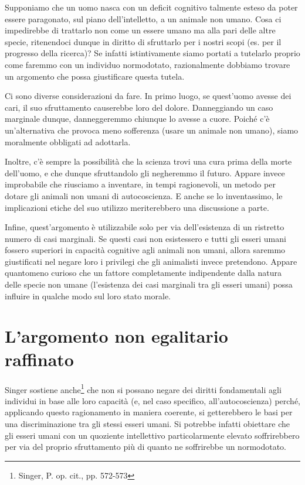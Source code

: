 \documentclass[a4paper,11pt,oneside,article]{memoir}
\begin{document}
Supponiamo che un uomo nasca con un deficit cognitivo talmente esteso da poter
essere paragonato, sul piano dell'intelletto, a un animale non umano. Cosa ci
impedirebbe di trattarlo non come un essere umano ma alla pari delle altre
specie, ritenendoci dunque in diritto di sfruttarlo per i nostri scopi (es. per
il progresso della ricerca)? Se infatti istintivamente siamo portati a tutelarlo
proprio come faremmo con un individuo normodotato, razionalmente dobbiamo
trovare un argomento che possa giustificare questa tutela.

Ci sono diverse considerazioni da fare. In primo luogo, se quest'uomo avesse dei
cari, il suo sfruttamento causerebbe loro del dolore. Danneggiando un caso
marginale dunque, danneggeremmo chiunque lo avesse a cuore. Poiché c'è
un'alternativa che provoca meno sofferenza (usare un animale non umano), siamo
moralmente obbligati ad adottarla.

Inoltre, c'è sempre la possibilità che la scienza trovi una cura prima della
morte dell'uomo, e che dunque sfruttandolo gli negheremmo il futuro. Appare
invece improbabile che riusciamo a inventare, in tempi ragionevoli, un metodo
per dotare gli animali non umani di autocoscienza. E anche se lo inventassimo,
le implicazioni etiche del suo utilizzo meriterebbero una discussione a parte.

Infine, quest'argomento è utilizzabile solo per via dell'esistenza di un
ristretto numero di casi marginali. Se questi casi non esistessero e tutti gli
esseri umani fossero superiori in capacità cognitive agli animali non umani,
allora saremmo giustificati nel negare loro i privilegi che gli animalisti
invece pretendono. Appare quantomeno curioso che un fattore completamente
indipendente dalla natura delle specie non umane (l'esistenza dei casi marginali
tra gli esseri umani) possa influire in qualche modo sul loro stato morale.

\section{L'argomento non egalitario raffinato}

Singer sostiene anche\footnote{Singer, P. op. cit., pp. 572-573} che non si
possano negare dei diritti fondamentali agli individui in base alle loro
capacità (e, nel caso specifico, all'autocoscienza) perché, applicando questo
ragionamento in maniera coerente, si getterebbero le basi per una
discriminazione tra gli stessi esseri umani. Si potrebbe infatti obiettare che
gli esseri umani con un quoziente intellettivo particolarmente elevato
soffrirebbero per via del proprio sfruttamento più di quanto ne soffrirebbe un
normodotato.
\end{document}
